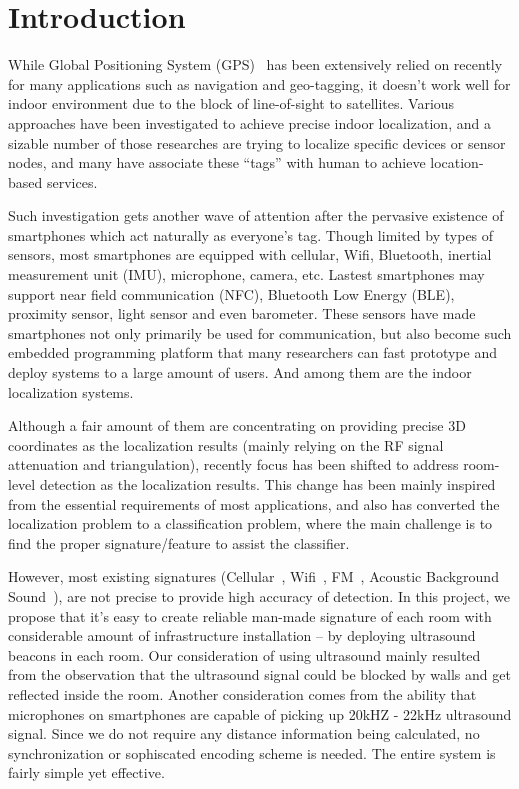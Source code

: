 \section{Introduction}
\label{sec:introduction}

While Global Positioning System (GPS)~\cite{hofmann1993global} has been extensively relied on recently for many applications such as navigation and geo-tagging, it doesn't work well for indoor environment due to the block of line-of-sight to satellites. Various approaches have been investigated to achieve precise indoor localization, and a sizable number of those researches are trying to localize specific devices or sensor nodes, and many have associate these ``tags'' with human to achieve location-based services. 

Such investigation gets another wave of attention after the pervasive existence of smartphones which act naturally as everyone's tag. Though limited by types of sensors, most smartphones are equipped with cellular, Wifi, Bluetooth, inertial measurement unit (IMU), microphone, camera, etc. Lastest smartphones may support near field communication (NFC), Bluetooth Low Energy (BLE), proximity sensor, light sensor and even barometer. These sensors have made smartphones not only primarily be used for communication, but also become such embedded programming platform that many researchers can fast prototype and deploy systems to a large amount of users. And among them are the indoor localization systems.

Although a fair amount of them are concentrating on providing precise 3D coordinates as the localization results (mainly relying on the RF signal attenuation and triangulation), recently focus has been shifted to address room-level detection as the localization results. This change has been mainly inspired from the essential requirements of most applications, and also has converted the localization problem to a classification problem, where the main challenge is to find the proper signature/feature to assist the classifier.

However, most existing signatures (Cellular~\cite{otsason2005accurate}, Wifi~\cite{cheng2005accuracy}, FM~\cite{chen2012fm}, Acoustic Background Sound~\cite{tarzia2011indoor}), are not precise to provide high accuracy of detection. In this project, we propose that it's easy to create reliable man-made signature of each room with considerable amount of infrastructure installation -- by deploying ultrasound beacons in each room. Our consideration of using ultrasound mainly resulted from the observation that the ultrasound signal could be blocked by walls and get reflected inside the room. Another consideration comes from the ability that microphones on smartphones are capable of picking up 20kHZ - 22kHz ultrasound signal. Since we do not require any distance information being calculated, no synchronization or sophiscated encoding scheme is needed. The entire system is fairly simple yet effective.

